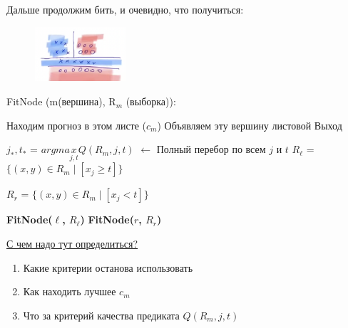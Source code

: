            Дальше продолжим бить, и очевидно, что получиться:

            \begin{figure}[H]
                \centering
                \includegraphics[width=0.3\textwidth]{images/8lecture/FitTreeSample4.png}
            \end{figure}

            
            \begin{algorithm}
            \caption{FitNode (m(вершина), R$_m$ (выборка)):}
            \begin{algorithmic}

                    \STATE Находим прогноз в этом листе ($c_m$) 
                    \STATE Объявляем эту вершину листовой
                    \STATE Выход
                \ENDIF

                \STATE $j_*, t_*$ = $argmax\limits_{j, t}Q(R_m, j, t)$ $\longleftarrow$ Полный перебор по всем $j$ и $t$
                \STATE $R_\ell$ = $\{(x, y) \in R_m \mid [x_j \geq t] \}$

                \STATE $R_r$ = $\{(x, y) \in R_m \mid [x_j < t] \}$

                \STATE \textbf{FitNode($\ell$, $R_\ell$)}
                \STATE \textbf{FitNode($r$, $R_r$)}
                
            \end{algorithmic}
            \end{algorithm}

            \newpage
            
            \underline{С чем надо тут определиться?}
            \begin{enumerate}
                \item Какие критерии останова использовать
                \item Как находить лучшее $c_m$
                \item Что за критерий качества предиката $Q(R_m, j, t)$
            \end{enumerate}


